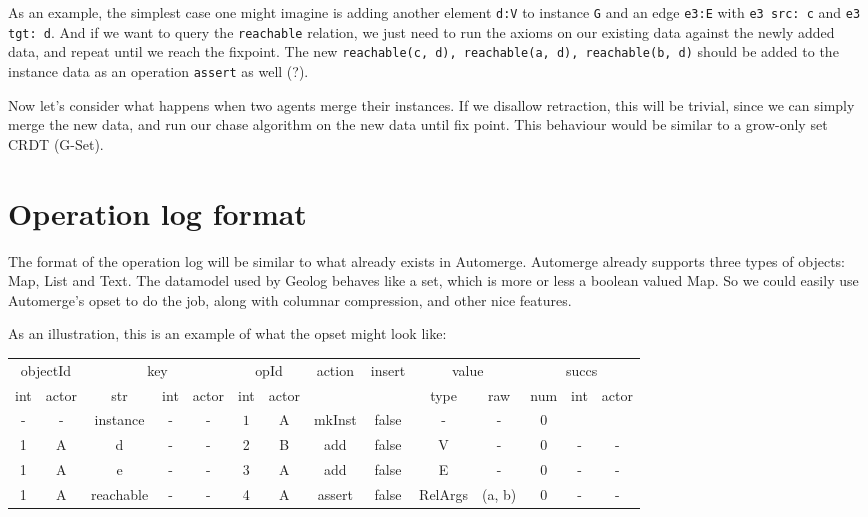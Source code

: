 \documentclass[12pt,a4paper,twoside]{article}
\begin{document}
As an example, the simplest case one might imagine is adding another element \verb|d:V|
to instance \verb|G| and an edge \verb|e3:E| with \verb|e3 src: c| and \verb|e3 tgt: d|. And if we
want to query the \verb|reachable| relation, we just need to run the axioms on our
existing data against the newly added data, and repeat until we reach the fixpoint.
The new \verb|reachable(c, d), reachable(a, d), reachable(b, d)| should be added
to the instance data as an operation \verb|assert| as well (?).

Now let's consider what happens when two agents merge their instances. If we disallow
retraction, this will be trivial, since we can simply merge the new data, and run
our chase algorithm on the new data until fix point. This behaviour would be similar
to a grow-only set CRDT (G-Set).
 
\section{Operation log format}

The format of the operation log will be similar to what already exists in Automerge.
Automerge already supports three types of objects: Map, List and Text. The datamodel
used by Geolog behaves like a set, which is more or less a boolean valued Map.
So we could easily use Automerge's opset to do the job, along with columnar compression,
and other nice features.

As an illustration, this is an example of what the opset might look like:


\begin{table}
\footnotesize
\begin{tabular}{cccccccccccccc}\toprule
  \multicolumn{2}{c}{objectId} & \multicolumn{3}{c}{key} & \multicolumn{2}{c}{opId} & action & insert & \multicolumn{2}{c}{value} & \multicolumn{3}{c}{succs} \\
  \cmidrule(lr){1-2}\cmidrule(lr){3-5}\cmidrule(lr){6-7}\cmidrule(lr){10-11}\cmidrule(lr){12-14}
  int & actor & str       & int & actor & int   & actor &        &       & type    & raw    & num   & int & actor \\\midrule
  -   & -     & instance  & -   & -     & \(1\) & A     & mkInst & false & -       & -      & \(0\) &     & \\
  1   & A     & d         & -   & -     & 2     & B     & add    & false & V       & -      & \(0\) & -   & - \\
  1   & A     & e         & -   & -     & 3     & A     & add    & false & E       & -      & \(0\) & -   & - \\
  1   & A     & reachable & -   & -     & 4     & A     & assert & false & RelArgs & (a, b) & \(0\) & -   & - \\\bottomrule
\end{tabular}
\end{table}
\end{document}
